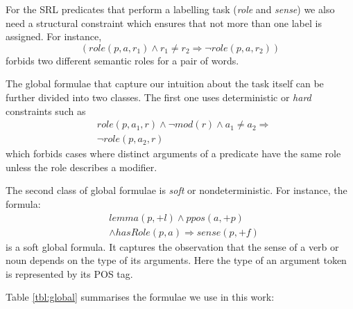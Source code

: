 For the SRL predicates that perform a labelling task (\emph{role} and \emph{sense}) we also need a structural constraint which ensures that not more than one label is assigned. For instance,
\[
(role(p,a,r_1) \wedge r_1 \neq r_2 \Rightarrow \neg role(p,a,r_2)  )
\]
forbids two different semantic roles for a pair of words. 

The global formulae that capture our intuition about the task itself can be further divided into two classes. The first one uses deterministic or \emph{hard} constraints such as
\begin{eqnarray*}
 &role\left(p,a_{1},r\right)\wedge \neg mod\left(r\right)\wedge a_{1}\neq a_{2}  \Rightarrow\\
  & \neg role\left(p,a_{2},r\right)
\end{eqnarray*}
which forbids cases where distinct arguments of a predicate have the same role unless the role describes a modifier.

The second class of global formulae is \emph{soft} or nondeterministic. For instance, the formula:
\begin{eqnarray*}
  & lemma(p,+l) \wedge ppos(a,+p)  \\
  & \wedge hasRole(p,a)  \Rightarrow sense(p,+f) 
\end{eqnarray*}
is a soft global formula. It captures the observation that the sense of a verb or noun depends on the type of its arguments. Here the type of an argument token is represented by its POS tag.

Table \ref{tbl:global} summarises the formulae we use in this work:

